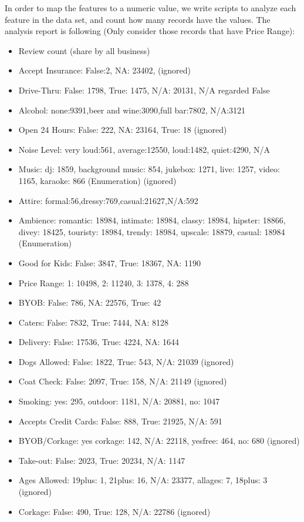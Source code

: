 \documentclass{article}
\begin{document}
In order to map the features to a numeric value, we write scripts to analyze each feature in the data set, and count how many records have the values. The analysis report is following (Only consider those records that have Price Range):
\begin{itemize}
\item Review count (share by all business)
\item Accept Insurance: False:2, NA: 23402, (ignored)
\item Drive-Thru: False: 1798, True: 1475, N/A: 20131, N/A regarded False
\item Alcohol: none:9391,beer and wine:3090,full bar:7802, N/A:3121
\item Open 24 Hours: False: 222, NA: 23164, True: 18 (ignored)
\item Noise Level:  very loud:561, average:12550, loud:1482, quiet:4290, N/A
\item Music: dj: 1859, background music: 854, jukebox: 1271, live: 1257, video: 1165, karaoke: 866 (Enumeration) (ignored)
\item Attire: formal:56,dressy:769,casual:21627,N/A:592
\item Ambience: romantic: 18984, intimate: 18984, classy: 18984, hipster: 18866, divey: 18425, touristy: 18984, trendy: 18984, upscale: 18879, casual: 18984 (Enumeration)
\item Good for Kids: False: 3847, True: 18367, NA: 1190
\item Price Range: 1: 10498, 2: 11240, 3: 1378, 4: 288
\item BYOB: False: 786, NA: 22576, True: 42
\item Caters: False: 7832, True: 7444, NA: 8128
\item Delivery: False: 17536, True: 4224, NA: 1644
\item Dogs Allowed: False: 1822, True: 543, N/A: 21039 (ignored)
\item Coat Check: False: 2097, True: 158, N/A: 21149 (ignored)
\item Smoking:  yes: 295, outdoor: 1181, N/A: 20881, no: 1047
\item Accepts Credit Cards: False: 888, True: 21925, N/A: 591
\item BYOB/Corkage: yes corkage: 142, N/A: 22118, yesfree: 464, no: 680 (ignored)
\item Take-out: False: 2023, True: 20234, N/A: 1147
\item Ages Allowed: 19plus: 1, 21plus: 16, N/A: 23377, allages: 7, 18plus: 3 (ignored)
\item Corkage: False: 490, True: 128, N/A: 22786 (ignored)

\end{itemize}
\end{document}
